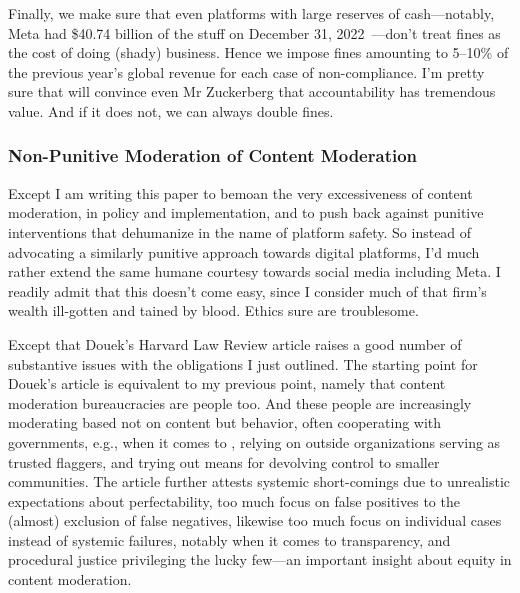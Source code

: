 Finally, we make sure that even platforms with large reserves of cash---notably,
Meta had \$40.74 billion of the stuff on December 31,
2022~\cite{MetaPlatforms2023}---don't treat fines as the cost of doing (shady)
business. Hence we impose fines amounting to 5--10\% of the previous year's
global revenue for each case of non-compliance. I'm pretty sure that will
convince even Mr Zuckerberg that accountability has tremendous value. And if it
does not, we can always double fines.


\subsubsection{Non-Punitive Moderation of Content Moderation}

Except I am writing this paper to bemoan the very excessiveness of content
moderation, in policy and implementation, and to push back against punitive
interventions that dehumanize in the name of platform safety. So instead of
advocating a similarly punitive approach towards digital platforms, I'd much
rather extend the same humane courtesy towards social media including Meta. I
readily admit that this doesn't come easy, since I consider much of that firm's
wealth ill-gotten and tained by blood. Ethics sure are troublesome.

Except that Douek's Harvard Law Review article raises a good number of
substantive issues with the obligations I just outlined. The starting point for
Douek's article is equivalent to my previous point, namely that content
moderation bureaucracies are people too. And these people are increasingly
moderating based not on content but behavior, often cooperating with
governments, e.g., when it comes to \CSAM, relying on outside organizations
serving as trusted flaggers, and trying out means for devolving control to
smaller communities. The article further attests systemic short-comings due to
unrealistic expectations about perfectability, too much focus on false positives
to the (almost) exclusion of false negatives, likewise too much focus on
individual cases instead of systemic failures, notably when it comes to
transparency, and procedural justice privileging the lucky few---an important
insight about equity in content moderation.

